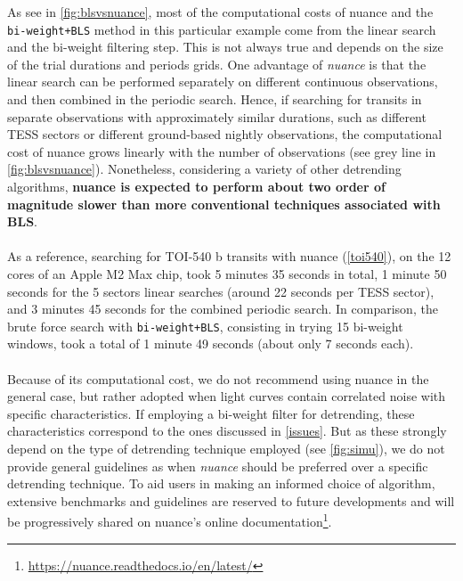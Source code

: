 \documentclass[modern]{aastex631}
\newcommand{\nuancemethod}{\textit{nuance}}
\newcommand{\nuancecode}{\textsf{nuance}}
\newcommand{\footlink}[1]{\footnote{\url{#1}}}
\begin{document}
As see in \autoref{fig:blsvsnuance}, most of the computational costs of \nuancecode{} and the \texttt{bi-weight+BLS} method in this particular example come from the linear search and the bi-weight filtering step. This is not always true and depends on the size of the trial durations and periods grids. One advantage of \nuancemethod{} is that the linear search can be performed separately on different continuous observations, and then combined in the periodic search. Hence, if searching for transits in separate observations with approximately similar durations, such as different TESS sectors or different ground-based nightly observations, the computational cost of \nuancecode{} grows linearly with the number of observations (see grey line in \autoref{fig:blsvsnuance}). Nonetheless, considering a variety of other detrending algorithms, \textbf{\nuancecode{} is expected to perform about two order of magnitude slower than more conventional techniques associated with BLS}.\\\\ 
As a reference, searching for TOI-540 b transits with nuance (\autoref{toi540}), on the 12 cores of an Apple M2 Max chip, took 5 minutes 35 seconds in total, 1 minute 50 seconds for the 5 sectors linear searches (around 22 seconds per TESS sector), and 3 minutes 45 seconds for the combined periodic search. In comparison, the brute force search with \texttt{bi-weight+BLS}, consisting in trying 15 bi-weight windows, took a total of 1 minute 49 seconds (about only 7 seconds each).\\\\
Because of its computational cost, we do not recommend using \nuancecode{} in the general case, but rather adopted when light curves contain correlated noise with specific characteristics. If employing a bi-weight filter for detrending, these characteristics correspond to the ones discussed in \autoref{issues}. But as these strongly depend on the type of detrending technique employed (see \autoref{fig:simu}), we do not provide general guidelines as when \nuancemethod{} should be preferred over a specific detrending technique. To aid users in making an informed choice of algorithm, extensive benchmarks and guidelines are reserved to future developments and will be progressively shared on \nuancecode{}'s online documentation\footlink{https://nuance.readthedocs.io/en/latest/}.
\end{document}
